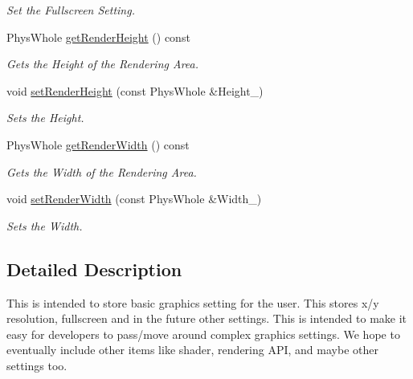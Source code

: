 \begin{DoxyCompactItemize}
\begin{DoxyCompactList}\small\item\em Set the Fullscreen Setting. \item\end{DoxyCompactList}\item 
PhysWhole \hyperlink{classphys_1_1GraphicsSettings_a4e9df38f338a0b660f68c716a6b4a223}{getRenderHeight} () const 
\begin{DoxyCompactList}\small\item\em Gets the Height of the Rendering Area. \item\end{DoxyCompactList}\item 
void \hyperlink{classphys_1_1GraphicsSettings_ace1f9f0f9c29a0c82524ce0bcffd16fa}{setRenderHeight} (const PhysWhole \&Height\_\-)
\begin{DoxyCompactList}\small\item\em Sets the Height. \item\end{DoxyCompactList}\item 
PhysWhole \hyperlink{classphys_1_1GraphicsSettings_aca019a830353f95f69c27c147c52dd03}{getRenderWidth} () const 
\begin{DoxyCompactList}\small\item\em Gets the Width of the Rendering Area. \item\end{DoxyCompactList}\item 
void \hyperlink{classphys_1_1GraphicsSettings_a4d74a7f2f880a5d556f43bcdbedc5e27}{setRenderWidth} (const PhysWhole \&Width\_\-)
\begin{DoxyCompactList}\small\item\em Sets the Width. \item\end{DoxyCompactList}\end{DoxyCompactItemize}


\subsection{Detailed Description}
This is intended to store basic graphics setting for the user. This stores x/y resolution, fullscreen and in the future other settings. This is intended to make it easy for developers to pass/move around complex graphics settings. We hope to eventually include other items like shader, rendering API, and maybe other settings too. 

